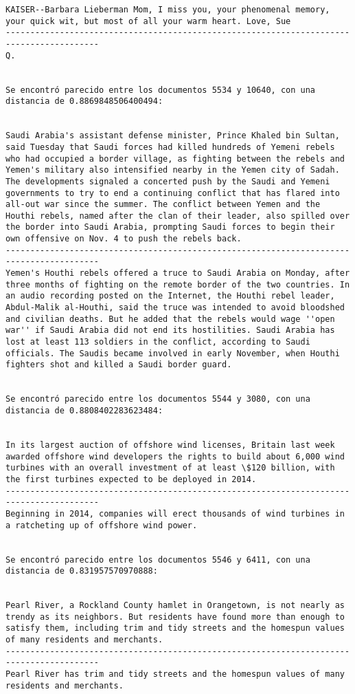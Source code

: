 \documentclass[11pt]{article}
\begin{document}
\begin{Verbatim}[commandchars=\\\{\}]
KAISER--Barbara Lieberman Mom, I miss you, your phenomenal memory, your quick wit, but most of all your warm heart. Love, Sue
-----------------------------------------------------------------------------------------
Q.


Se encontró parecido entre los documentos 5534 y 10640, con una distancia de 0.8869848506400494:


Saudi Arabia's assistant defense minister, Prince Khaled bin Sultan, said Tuesday that Saudi forces had killed hundreds of Yemeni rebels who had occupied a border village, as fighting between the rebels and Yemen's military also intensified nearby in the Yemen city of Sadah. The developments signaled a concerted push by the Saudi and Yemeni governments to try to end a continuing conflict that has flared into all-out war since the summer. The conflict between Yemen and the Houthi rebels, named after the clan of their leader, also spilled over the border into Saudi Arabia, prompting Saudi forces to begin their own offensive on Nov. 4 to push the rebels back.
-----------------------------------------------------------------------------------------
Yemen's Houthi rebels offered a truce to Saudi Arabia on Monday, after three months of fighting on the remote border of the two countries. In an audio recording posted on the Internet, the Houthi rebel leader, Abdul-Malik al-Houthi, said the truce was intended to avoid bloodshed and civilian deaths. But he added that the rebels would wage ''open war'' if Saudi Arabia did not end its hostilities. Saudi Arabia has lost at least 113 soldiers in the conflict, according to Saudi officials. The Saudis became involved in early November, when Houthi fighters shot and killed a Saudi border guard.


Se encontró parecido entre los documentos 5544 y 3080, con una distancia de 0.8808402283623484:


In its largest auction of offshore wind licenses, Britain last week awarded offshore wind developers the rights to build about 6,000 wind turbines with an overall investment of at least \$120 billion, with the first turbines expected to be deployed in 2014.
-----------------------------------------------------------------------------------------
Beginning in 2014, companies will erect thousands of wind turbines in a ratcheting up of offshore wind power.


Se encontró parecido entre los documentos 5546 y 6411, con una distancia de 0.831957570970888:


Pearl River, a Rockland County hamlet in Orangetown, is not nearly as trendy as its neighbors. But residents have found more than enough to satisfy them, including trim and tidy streets and the homespun values of many residents and merchants.
-----------------------------------------------------------------------------------------
Pearl River has trim and tidy streets and the homespun values of many residents and merchants.



\end{Verbatim}
\end{document}
